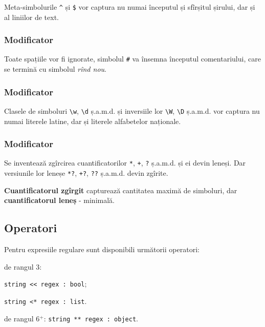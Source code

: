 Meta-simbolurile \lstinline|^| și \lstinline|$| vor captura nu numai începutul și sfîrșitul șirului, dar și al liniilor de text.

\subsubsection{Modificator }

Toate spațiile vor fi ignorate, simbolul \lstinline|#| va însemna începutul comentariului, care se termină cu simbolul {\it rînd nou}.

\subsubsection{Modificator }

Clasele de simboluri \lstinline|\w|, \lstinline|\d| ș.a.m.d. și inversiile lor \lstinline|\W|, \lstinline|\D| ș.a.m.d. vor captura nu numai literele latine, dar și literele alfabetelor naționale.

\subsubsection{Modificator }

Se inventează zgîrcirea cuantificatorilor \lstinline|*|, \lstinline|+|, \lstinline|?| ș.a.m.d. și ei devin leneși. Dar versiunile lor leneșe \lstinline|*?|, \lstinline|+?|, \lstinline|??| ș.a.m.d. devin zgîrite.

{\bf Cuantificatorul zgîrgit} capturează cantitatea maximă de simboluri, dar {\bf cuantificatorul leneș} - minimală.

\subsection{Operatori}

Pentru expresiile regulare sunt disponibili următorii operatori:
\begin{icItems}
\item
	de rangul 3:
	\begin{icItems}
	\item
		\lstinline|string << regex : bool|;
	\item
		\lstinline|string <* regex : list|.
	\end{icItems}

\item 
	de rangul 6$^+$: \lstinline|string ** regex : object|.
\end{icItems}

